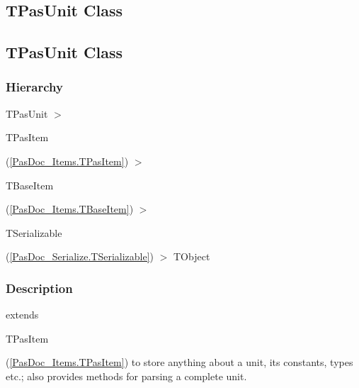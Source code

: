 \documentclass{report}
\begin{document}
\subsection*{\large{\textbf{TPasUnit Class}}\normalsize\hspace{1ex}\hrulefill}
\else
\subsection*{TPasUnit Class}
\fi
\label{PasDoc_Items.TPasUnit}
\subsubsection*{\large{\textbf{Hierarchy}}\normalsize\hspace{1ex}\hfill}
TPasUnit {$>$} \begin{ttfamily}TPasItem\end{ttfamily}(\ref{PasDoc_Items.TPasItem}) {$>$} \begin{ttfamily}TBaseItem\end{ttfamily}(\ref{PasDoc_Items.TBaseItem}) {$>$} \begin{ttfamily}TSerializable\end{ttfamily}(\ref{PasDoc_Serialize.TSerializable}) {$>$} 
TObject
\subsubsection*{\large{\textbf{Description}}\normalsize\hspace{1ex}\hfill}
extends \begin{ttfamily}TPasItem\end{ttfamily}(\ref{PasDoc_Items.TPasItem}) to store anything about a unit, its constants, types etc.; also provides methods for parsing a complete unit.
\end{document}
